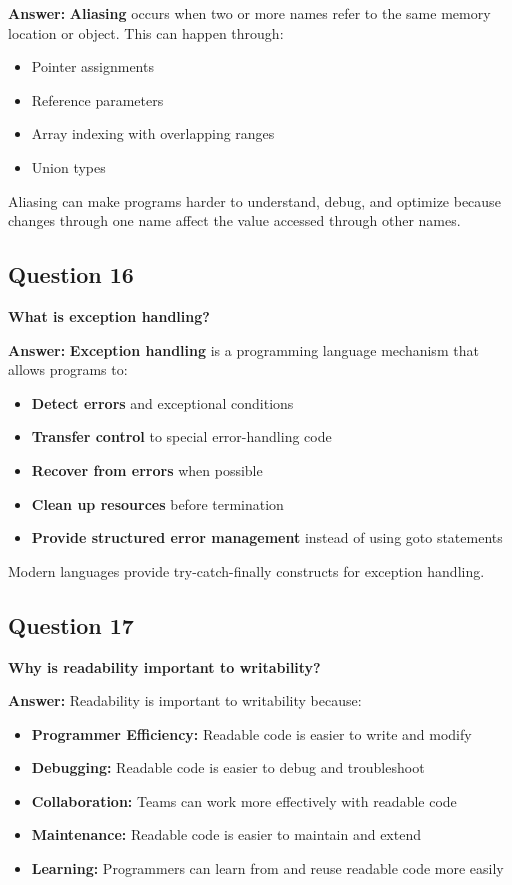 \documentclass[11pt,a4paper]{article}
\begin{document}
\textbf{Answer:}
\textbf{Aliasing} occurs when two or more names refer to the same memory location or object. This can happen through:

\begin{itemize}
\item Pointer assignments
\item Reference parameters
\item Array indexing with overlapping ranges
\item Union types
\end{itemize}

Aliasing can make programs harder to understand, debug, and optimize because changes through one name affect the value accessed through other names.

\subsection{Question 16}
\textbf{What is exception handling?}

\textbf{Answer:}
\textbf{Exception handling} is a programming language mechanism that allows programs to:

\begin{itemize}
\item \textbf{Detect errors} and exceptional conditions
\item \textbf{Transfer control} to special error-handling code
\item \textbf{Recover from errors} when possible
\item \textbf{Clean up resources} before termination
\item \textbf{Provide structured error management} instead of using goto statements
\end{itemize}

Modern languages provide try-catch-finally constructs for exception handling.

\subsection{Question 17}
\textbf{Why is readability important to writability?}

\textbf{Answer:}
Readability is important to writability because:

\begin{itemize}
\item \textbf{Programmer Efficiency:} Readable code is easier to write and modify
\item \textbf{Debugging:} Readable code is easier to debug and troubleshoot
\item \textbf{Collaboration:} Teams can work more effectively with readable code
\item \textbf{Maintenance:} Readable code is easier to maintain and extend
\item \textbf{Learning:} Programmers can learn from and reuse readable code more easily
\end{itemize}
\end{document}
